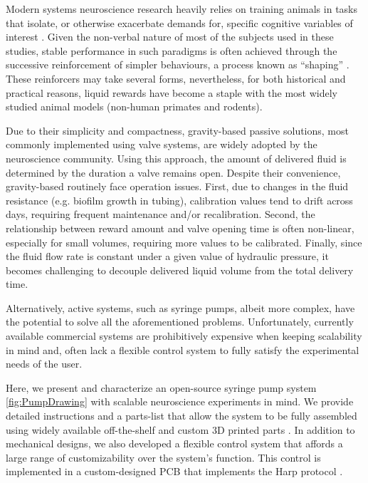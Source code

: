 Modern systems neuroscience research heavily relies on training animals in tasks that isolate, or otherwise exacerbate demands for, specific cognitive variables of interest \citep{Gomez-Marin2016}. Given the non-verbal nature of most of the subjects used in these studies, stable performance in such paradigms is often achieved through the successive reinforcement of simpler behaviours, a process known as “shaping” \citep{Jones1939}. These reinforcers may take several forms, nevertheless, for both historical and practical reasons, liquid rewards have become a staple with the most widely studied animal models (non-human primates and rodents)\citep{Guo2014}. 

Due to their simplicity and compactness, gravity-based passive solutions, most commonly implemented using valve systems, are widely adopted by the neuroscience community. Using this approach, the amount of delivered fluid is determined by the duration a valve remains open. Despite their convenience, gravity-based routinely face operation issues. First, due to changes in the fluid resistance (e.g. biofilm growth in tubing), calibration values tend to drift across days, requiring frequent maintenance and/or recalibration. Second, the relationship between reward amount and valve opening time is often non-linear, especially for small volumes, requiring more values to be calibrated. Finally, since the fluid flow rate is constant under a given value of hydraulic pressure, it becomes challenging to decouple delivered liquid volume from the total delivery time.

Alternatively, active systems, such as syringe pumps, albeit more complex, have the potential to solve all the aforementioned problems. Unfortunately, currently available commercial systems are prohibitively expensive when keeping scalability in mind and, often lack a flexible control system to fully satisfy the experimental needs of the user.

Here, we present and characterize an open-source syringe pump system \ref{fig:PumpDrawing} with scalable neuroscience experiments in mind. We provide detailed instructions and a parts-list that allow the system to be fully assembled using widely available off-the-shelf and custom 3D printed parts . 
In addition to mechanical designs, we also developed a flexible control system that affords a large range of customizability over the system's function. This control is implemented in a custom-designed PCB that implements the Harp protocol .

